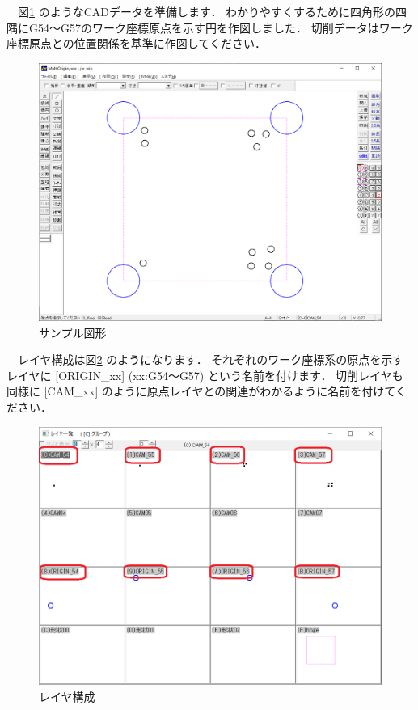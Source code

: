 

\vspace*{1zh}
　図\ref{fig:sample.jww} のようなCADデータを準備します．
わかりやすくするために四角形の四隅にG54～G57のワーク座標原点を示す円を作図しました．
切削データはワーク座標原点との位置関係を基準に作図してください．

\begin{figure}[H]
\centering
\includegraphics[scale=0.5]{No2/fig/sample.jww.png}
\caption{サンプル図形}
\label{fig:sample.jww}
\end{figure}

　レイヤ構成は図\ref{fig:layer} のようになります．
それぞれのワーク座標系の原点を示すレイヤに [ORIGIN\_xx] (xx:G54～G57) という名前を付けます．
切削レイヤも同様に [CAM\_xx] のように原点レイヤとの関連がわかるように名前を付けてください．

\begin{figure}[H]
\centering
\includegraphics[scale=0.55]{No2/fig/layer.png}
\caption{レイヤ構成}
\label{fig:layer}
\end{figure}

